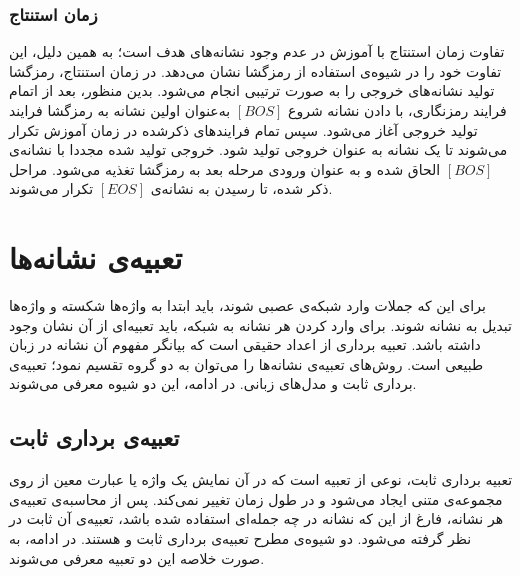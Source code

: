 \subsubsection{زمان استنتاج}
تفاوت زمان استنتاج با آموزش در عدم وجود نشانه‌های هدف است؛ به همین دلیل، این تفاوت خود را در شیوه‌ی استفاده از رمزگشا نشان می‌دهد. در زمان استنتاج، رمزگشا تولید نشانه‌های خروجی را به صورت ترتیبی انجام می‌شود. بدین منظور، بعد از اتمام فرایند رمزنگاری، با دادن نشانه شروع $[BOS]$ به‌عنوان اولین نشانه به رمزگشا فرایند تولید خروجی آغاز می‌شود. سپس تمام فرایند‌های ذکرشده در زمان آموزش تکرار می‌شوند تا یک نشانه به عنوان خروجی تولید شود. خروجی تولید شده مجددا با نشانه‌ی $[BOS]$ الحاق شده و به عنوان ورودی مرحله بعد به رمزگشا تغذیه می‌شود. مراحل ذکر شده، تا رسیدن به نشانه‌ی $[EOS]$ تکرار می‌شوند.

\section{تعبیه‌ی نشانه‌ها}
برای این که جملات وارد شبکه‌ی عصبی شوند، باید ابتدا به واژه‌ها شکسته و واژه‌ها تبدیل به نشانه شوند. برای وارد کردن هر نشانه به شبکه، باید تعبیه‌ای از آن نشان وجود داشته باشد. تعبیه برداری از اعداد حقیقی است که بیانگر مفهوم آن نشانه در زبان طبیعی است. روش‌های تعبیه‌ی نشانه‌ها را می‌توان به دو گروه تقسیم نمود؛ تعبیه‌ی برداری ثابت و مدل‌های زبانی. در ادامه، این دو شیوه معرفی می‌شوند. 
\subsection{تعبیه‌ی برداری ثابت}
تعبیه برداری ثابت، نوعی از تعبیه است که در آن نمایش یک واژه یا عبارت معین از روی مجموعه‌ی متنی ایجاد می‌شود و در طول زمان تغییر نمی‌کند. پس از محاسبه‌ی تعبیه‌ی هر نشانه، فارغ از این ‌که نشانه در چه جمله‌ای استفاده شده باشد، تعبیه‌ی آن ثابت در نظر گرفته می‌شود. دو شیوه‌ی مطرح تعبیه‌ی برداری ثابت  و  هستند. در ادامه، به صورت خلاصه این دو تعبیه معرفی می‌شوند.
